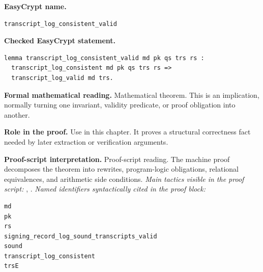 \begin{formaltheorem}
\noindent\textbf{EasyCrypt name.}
\begin{lstlisting}[language=EasyCrypt,basicstyle=\ttfamily\scriptsize]
transcript_log_consistent_valid
\end{lstlisting}
\noindent\textbf{Checked EasyCrypt statement.}
\begin{lstlisting}[language=EasyCrypt,basicstyle=\ttfamily\scriptsize]
lemma transcript_log_consistent_valid md pk qs trs rs :
  transcript_log_consistent md pk qs trs rs =>
  transcript_log_valid md trs.
\end{lstlisting}
\noindent\textbf{Formal mathematical reading.}
Mathematical theorem. This is an implication, normally turning one invariant, validity predicate, or proof obligation into another.

\noindent\textbf{Role in the proof.}
Use in this chapter. It proves a structural correctness fact needed by later extraction or verification arguments.

\noindent\textbf{Proof-script interpretation.}
Proof-script reading. The machine proof decomposes the theorem into rewrites, program-logic obligations, relational equivalences, and arithmetic side conditions.
\emph{Main tactics visible in the proof script:} , .
\emph{Named identifiers syntactically cited in the proof block:}
\begin{lstlisting}[language=EasyCrypt,basicstyle=\ttfamily\scriptsize]
md
pk
rs
signing_record_log_sound_transcripts_valid
sound
transcript_log_consistent
trsE
\end{lstlisting}

\end{formaltheorem}

